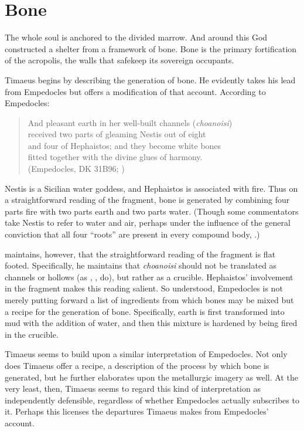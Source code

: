 
\section{Bone} %
\label{sec:bone}

The whole soul is anchored to the divided marrow. And around this God constructed a shelter from a framework of bone. Bone is the primary fortification of the acropolis, the walls that safekeep its sovereign occupants.

Timaeus begins by describing the generation of bone. He evidently takes his lead from Empedocles but offers a modification of that account. According to Empedocles:
\begin{verse}
	And pleasant earth in her well-built channels (\emph{choanoisi})\\
	received two parts of gleaming Nestis out of eight\\
	and four of Hephaistos; and they become white bones\\
	fitted together with the divine glues of harmony.\\
	(Empedocles, DK 31B96; \citealt[62 245]{Inwood:2001ve})
\end{verse}
Nestis is a Sicilian water goddess, and Hephaistos is associated with fire. Thus on a straightforward reading of the fragment, bone is generated by combining four parts fire with two parts earth and two parts water. (Though some commentators take Nestis to refer to water and air, perhaps under the influence of the general conviction that all four ``roots'' are present in every compound body, \citealt[209 n2]{Wright:1981zr}.) 

\citet[301-2]{Palmer:2009qf} maintains, however, that the straightforward reading of the fragment is flat footed. Specifically, he maintains that \emph{choanoisi} should not be translated as channels or hollows (as \citealt[151 n1]{Guthrie:1965ys}, \citealt[208--9]{Wright:1981zr}, \citealt[62 245]{Inwood:2001ve} do), but rather as a crucible. Hephaistos' involvement in the fragment makes this reading salient. So understood, Empedocles is not merely putting forward a list of ingredients from which bones may be mixed but a recipe for the generation of bone. Specifically, earth is first transformed into mud with the addition of water, and then this mixture is hardened by being fired in the crucible.

Timaeus seems to build upon a similar interpretation of Empedocles. Not only does Timaeus offer a recipe, a description of the process by which bone is generated, but he further elaborates upon the metallurgic imagery as well. At the very least, then, Timaeus seems to regard this kind of interpretation as independently defensible, regardless of whether Empedocles actually subscribes to it. Perhaps this licenses the departures Timaeus makes from Empedocles' account. 

